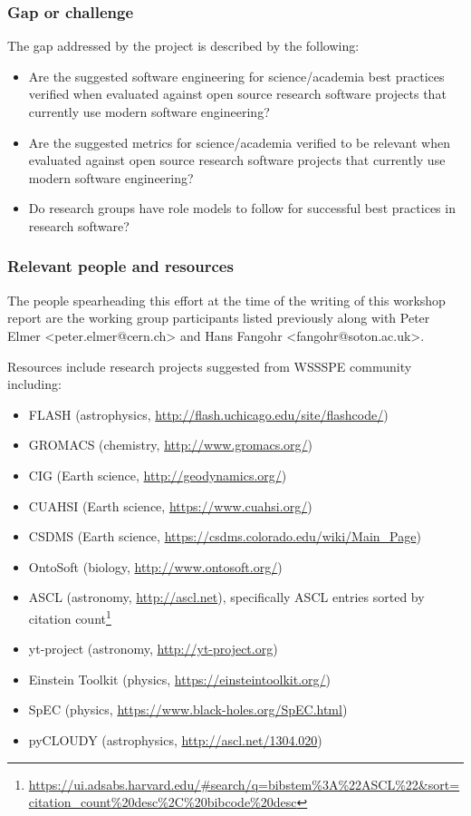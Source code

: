 \subsubsection{Gap or challenge}

The gap addressed by the project is described by the following:
\begin{itemize}
\item Are the suggested software engineering for science/academia best practices verified when evaluated against open source research software projects that currently use modern software engineering?
\item Are the suggested metrics for science/academia verified to be relevant when evaluated against open source research software projects that currently use modern software engineering?
\item Do research groups have role models to follow for successful best practices in research software?
\end{itemize}

\subsubsection{Relevant people and resources}

The people spearheading this effort at the time of the writing of this workshop report are the
working group participants listed previously along with Peter Elmer <peter.elmer@cern.ch> and Hans Fangohr <fangohr@soton.ac.uk>.

Resources include research projects suggested from WSSSPE community including:
\begin{itemize}
\item FLASH (astrophysics, \url{http://flash.uchicago.edu/site/flashcode/})
\item GROMACS (chemistry, \url{http://www.gromacs.org/})
\item CIG (Earth science, \url{http://geodynamics.org/})
\item CUAHSI (Earth science, \url{https://www.cuahsi.org/})
\item CSDMS (Earth science, \url{https://csdms.colorado.edu/wiki/Main_Page})
\item OntoSoft (biology, \url{http://www.ontosoft.org/})
\item ASCL (astronomy, \url{http://ascl.net}), specifically ASCL entries sorted by citation count\footnote{\url{https://ui.adsabs.harvard.edu/\#search/q=bibstem\%3A\%22ASCL\%22&sort=citation_count\%20desc\%2C\%20bibcode\%20desc}}
\item yt-project (astronomy,  \url{http://yt-project.org})
\item Einstein Toolkit (physics, \url{https://einsteintoolkit.org/})
\item SpEC (physics, \url{https://www.black-holes.org/SpEC.html})
\item pyCLOUDY (astrophysics, \url{http://ascl.net/1304.020})
\end{itemize}

